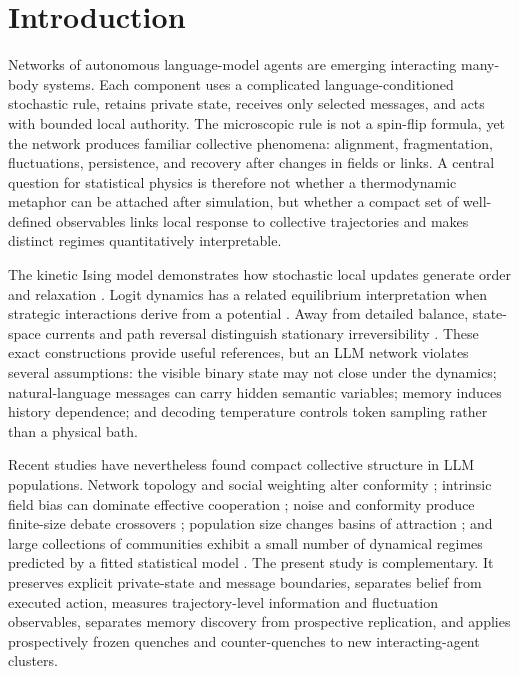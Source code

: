 \documentclass[12pt]{article}
\begin{document}
\section{Introduction}

Networks of autonomous language-model agents are emerging interacting
many-body systems. Each component uses a complicated language-conditioned
stochastic rule, retains private state, receives only selected messages, and
acts with bounded local authority. The microscopic rule is not a spin-flip
formula, yet the network produces familiar collective phenomena: alignment,
fragmentation, fluctuations, persistence, and recovery after changes in fields
or links. A central question for statistical physics is therefore not whether a
thermodynamic metaphor can be attached after simulation, but whether a compact
set of well-defined observables links local response to collective trajectories
and makes distinct regimes quantitatively interpretable.

The kinetic Ising model demonstrates how stochastic local updates generate
order and relaxation \cite{glauber1963}. Logit dynamics has a related
equilibrium interpretation when strategic interactions derive from a potential
\cite{blume1993}. Away from detailed balance, state-space currents and path
reversal distinguish stationary irreversibility \cite{schnakenberg1976,
seifert2005,seifert2012}. These exact constructions provide useful references,
but an LLM network violates several assumptions: the visible binary state may
not close under the dynamics; natural-language messages can carry hidden
semantic variables; memory induces history dependence; and decoding
temperature controls token sampling rather than a physical bath.

Recent studies have nevertheless found compact collective structure in LLM
populations. Network topology and social weighting alter conformity
\cite{han2026}; intrinsic field bias can dominate effective cooperation
\cite{denobili2026}; noise and conformity produce finite-size debate
crossovers \cite{okawa2026}; population size changes basins of attraction
\cite{flint2025}; and large collections of communities exhibit a small number
of dynamical regimes predicted by a fitted statistical model \cite{el2026}.
The present study is complementary. It preserves explicit private-state and
message boundaries, separates belief from executed action, measures
trajectory-level information and fluctuation observables, separates memory
discovery from prospective replication, and applies prospectively frozen
quenches and counter-quenches to new interacting-agent clusters.
\end{document}
